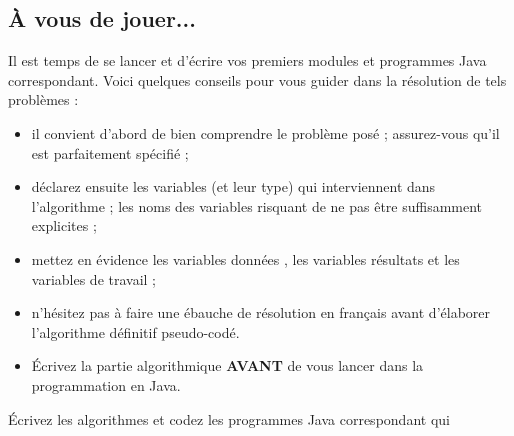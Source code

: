 \documentclass[11pt,a4paper]{article}
\begin{document}
            \par
        \subsection{\`A vous de jouer...}
          Il est temps de se lancer et d'\'ecrire vos premiers modules et programmes Java correspondant. 
          Voici quelques conseils pour vous guider dans la r\'esolution de tels probl\`emes :
          
					\begin{itemize}
				
			\item il convient d'abord de bien comprendre le probl\`eme pos\'e ; assurez-vous qu'il est parfaitement sp\'ecifi\'e ;
			\item d\'eclarez ensuite les variables (et leur type) qui interviennent dans l'algorithme ; les noms des variables risquant de ne pas \^etre suffisamment explicites ;
			\item mettez en \'evidence les variables \guillemotleft  donn\'ees \guillemotright , les variables \guillemotleft  r\'esultats \guillemotright  et les variables de travail ;
			\item n'h\'esitez pas \`a faire une \'ebauche de r\'esolution en fran\c cais avant d'\'elaborer l'algorithme d\'efinitif pseudo-cod\'e.
			\item \'Ecrivez la partie algorithmique \textbf{AVANT} de vous lancer dans la programmation en Java.
					\end{itemize}
				
            \par
        
        \'Ecrivez les algorithmes et codez les programmes Java correspondant qui 
          
\end{document}
